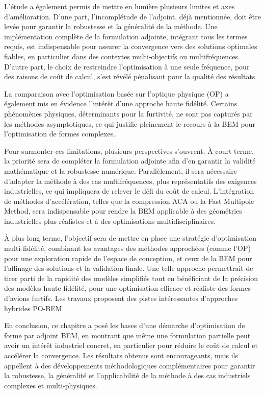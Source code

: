 L'étude a également permis de mettre en lumière plusieurs limites et axes d'amélioration. D'une part, l'incomplétude de l'adjoint, déjà mentionnée, doit être levée pour garantir la robustesse et la généralité de la méthode. Une implémentation complète de la formulation adjointe, intégrant tous les termes requis, est indispensable pour assurer la convergence vers des solutions optimales fiables, en particulier dans des contextes multi-objectifs ou multifréquences. D'autre part, le choix de restreindre l'optimisation à une seule fréquence, pour des raisons de coût de calcul, s'est révélé pénalisant pour la qualité des résultats. %

La comparaison avec l'optimisation basée sur l'optique physique (OP) a également mis en évidence l'intérêt d'une approche haute fidélité. Certains phénomènes physiques, déterminants pour la furtivité, ne sont pas capturés par les méthodes asymptotiques, ce qui justifie pleinement le recours à la BEM pour l'optimisation de formes complexes. 

Pour surmonter ces limitations, plusieurs perspectives s'ouvrent. À court terme, la priorité sera de compléter la formulation adjointe afin d'en garantir la validité mathématique et la robustesse numérique. Parallèlement, il sera nécessaire d'adapter la méthode à des cas multifréquences, plus représentatifs des exigences industrielles, ce qui impliquera de relever le défi du coût de calcul. L'intégration de méthodes d'accélération, telles que la compression ACA ou la Fast Multipole Method, sera indispensable pour rendre la BEM applicable à des géométries industrielles plus réalistes et à des optimisations multidisciplinaires.

À plus long terme, l'objectif sera de mettre en place une stratégie d'optimisation multi-fidélité, combinant les avantages des méthodes approchées (comme l'OP) pour une exploration rapide de l'espace de conception, et ceux de la BEM pour l'affinage des solutions et la validation finale. Une telle approche permettrait de tirer parti de la rapidité des modèles simplifiés tout en bénéficiant de la précision des modèles haute fidélité, pour une optimisation efficace et réaliste des formes d'avions furtifs. Les travaux \cite{Jakobus2002,Jakobus2002a} proposent des pistes intéressantes d'approches hybrides PO-BEM.

En conclusion, ce chapitre a posé les bases d'une démarche d'optimisation de forme par adjoint BEM, en montrant que même une formulation partielle peut avoir un intérêt industriel concret, en particulier pour réduire le coût de calcul et accélérer la convergence. Les résultats obtenus sont encourageants, mais ils appellent à des développements méthodologiques complémentaires pour garantir la robustesse, la généralité et l'applicabilité de la méthode à des cas industriels complexes et multi-physiques.

\printbibliography[heading=subbibintoc]
